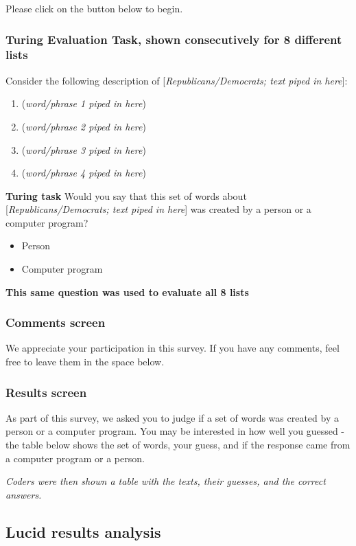 \documentclass[11pt]{article}
\begin{document}
\noindent Please click on the button below to begin.

\subsubsection*{Turing Evaluation Task, shown consecutively for 8 different lists}

Consider the following description of [\textit{Republicans/Democrats; text piped in here}]:
\begin{enumerate}
    \item (\textit{word/phrase 1 piped in here})
    \item (\textit{word/phrase 2 piped in here})
    \item (\textit{word/phrase 3 piped in here})
    \item (\textit{word/phrase 4 piped in here})
\end{enumerate}

\noindent\textbf{Turing task} Would you say that this set of words about [\textit{Republicans/Democrats; text piped in here}] was created by a person or a computer program?
\begin{itemize}
  \item Person
  \item Computer program
\end{itemize}

\noindent\textbf{This same question was used to evaluate all 8 lists}

\subsubsection*{Comments screen}
We appreciate your participation in this survey. If you have any comments, feel free to leave them in the space below.

\subsubsection*{Results screen}
As part of this survey, we asked you to judge if a set of words was created by a person or a computer program. You may be interested in how well you guessed - the table below shows the set of words, your guess, and if the response came from a computer program or a person.

\noindent\textit{Coders were then shown a table with the texts, their guesses, and the correct answers.}


\subsection{Lucid results analysis}
\end{document}
